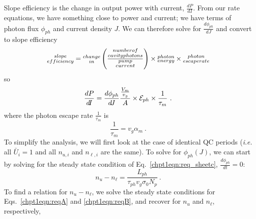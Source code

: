\documentclass[12pt]{report}
\begin{document}
{Slope efficiency is the change in output power with current, $\frac{d P}{dI}$.  From our rate equations, we have something close to power and current; we have terms of photon flux $\phi_{ph}$ and current density $J$.  We can therefore solve for $\frac{d \phi_{ph}}{dJ}$ and convert to slope efficiency
\begin{equation*}
\begin{subarray}{c}{slope}\\{efficiency}\end{subarray} = \begin{subarray}{c}change\\in\end{subarray} \left( \frac{\begin{subarray}{c}{number of}\\{cavity photons}\end{subarray}}{\begin{subarray}{c}{pump}\\{current}\end{subarray}} \right) \times \begin{subarray}{c}{photon}\\ {energy}\end{subarray} \times \begin{subarray}{c}{photon}\\ {escape rate}\end{subarray}
\end{equation*}
so
\begin{equation}
\label{chpt1eqn:slope_eff_outline}
\frac{d P}{d\!I} = \frac{d \phi_{ph}}{d\!J} \frac{\frac{V_m}{v_g}}{A} \times \EE_{ph} \times \frac{1}{\tau_m} \text{~.}
\end{equation}
where the photon escape rate $\frac{1}{\tau_m}$ is
\begin{equation}
\frac{1}{\tau_m} = v_g \alpha_m {~.}
\end{equation}
To simplify the analysis, we will first look at the case of identical QC periods (\emph{i.e.} all $\bar{U}_i=1$ and all $n_{u,i}$ and $n_{\ell,i}$ are the same).  To solve for $\phi_{ph}(J)$, we can start by solving for the steady state condition of Eq.~\eqref{chpt1eqn:req_sheetc}, $\frac{d \phi_{ph}}{d\!t}=0$:
\begin{equation}
\label{chpt1eqn:n_uminusn_l_easy}
n_u-n_\ell=\frac{L_{ph}}{\tau_{ph} v_g \sigma_0 N_p} {~.}
\end{equation}
To find a relation for $n_u-n_\ell$, we solve the steady state conditions for Eqs.~\eqref{chpt1eqn:reqA} and \eqref{chpt1eqn:reqB}, and recover for $n_u$ and $n_\ell$, respectively,
}
\end{document}
